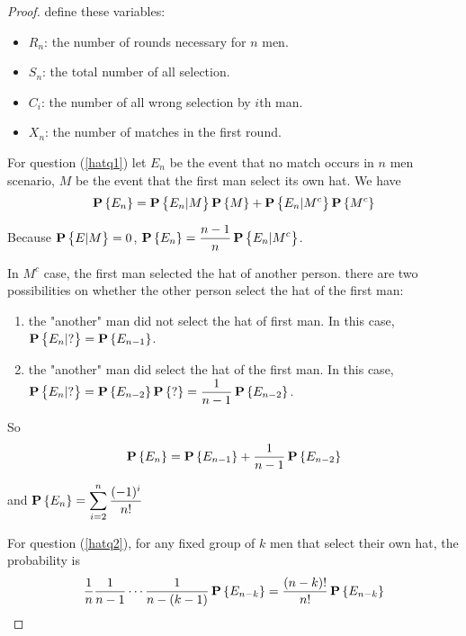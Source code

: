 \begin{proof}
    define these variables:
    \begin{itemize}
        \item $R_n$: the number of rounds necessary for $n$ men.
        \item $S_n$: the total number of all selection.
        \item $C_i$: the number of all wrong selection by $i$th man.
        \item $X_n$: the number of matches in the first round.
    \end{itemize}
    
    For question (\ref{hatq1}) let $E_n$ be the event that no match occurs in $n$ men scenario, $M$ be the event that the first man select its own hat. We have
    \begin{equation*}
        \mathop{\bf P\/}\displaystyle \left\{E_n\right\} = \mathop{\bf P\/}\displaystyle \left\{E_n|M\right\} \mathop{\bf P\/}\displaystyle \left\{M\right\} + \mathop{\bf P\/}\displaystyle \left\{E_n|M^c\right\} \mathop{\bf P\/}\displaystyle \left\{M^c\right\}
    \end{equation*}

    Because $\mathop{\bf P\/}\displaystyle \left\{E|M\right\} = 0$, $\mathop{\bf P\/}\displaystyle \left\{E_n\right\} = \dfrac{n-1}{n} \mathop{\bf P\/}\displaystyle \left\{E_n|M^c\right\} $.
    
    In $M^c$ case, the first man selected the hat of another person. there are two possibilities on whether the other person select the hat of the first man:
    \begin{enumerate}
        \item the "another" man did not select the hat of first man. In this case, $\mathop{\bf P\/}\displaystyle \left\{E_{n}|?\right\} = \mathop{\bf P\/}\displaystyle \left\{E_{n-1}\right\}$.
        \item the "another" man did select the hat of the first man. In this case, $\mathop{\bf P\/}\displaystyle \left\{E_{n}|?\right\} = \mathop{\bf P\/}\displaystyle \left\{E_{n-2}\right\} \mathop{\bf P\/}\displaystyle \left\{?\right\} = \dfrac{1}{n-1} \mathop{\bf P\/}\displaystyle \left\{E_{n-2}\right\}$.
    \end{enumerate}
    
    So 
    \begin{equation*}
        \mathop{\bf P\/}\displaystyle \left\{E_n\right\} = \mathop{\bf P\/}\displaystyle \left\{E_{n-1}\right\} + \frac{1}{n-1} \mathop{\bf P\/}\displaystyle \left\{E_{n-2}\right\}
    \end{equation*}
    
    and $\mathop{\bf P\/}\displaystyle \left\{E_n\right\} = \displaystyle \sum_{i=2}^n \frac{(-1)^i}{n!}$
    
    
    For question (\ref{hatq2}), for any fixed group of $k$ men that select their own hat, the probability is 
    \begin{equation*}
        \frac{1}{n} \frac{1}{n-1} \cdots \frac{1}{n-(k-1)} \mathop{\bf P\/}\displaystyle \left\{E_{n-k}\right\} = \frac{(n-k)!}{n!} \mathop{\bf P\/}\displaystyle \left\{E_{n-k}\right\}
    \end{equation*}
    

\end{proof}
